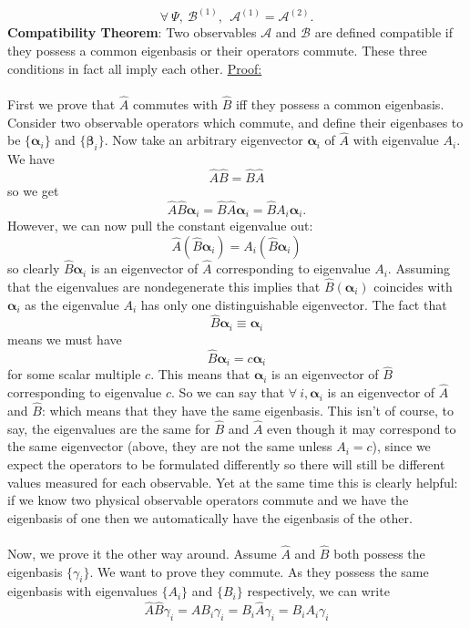 $$
\forall\:\Psi,\:\mathcal{B}^{(1)},\:\:\mathcal{A}^{(1)}=\mathcal{A}^{(2)}.
$$
\Answer
\textbf{Compatibility Theorem}: Two observables $\mathcal{A}$ and $\mathcal{B}$ are defined compatible if they possess a common eigenbasis or their operators commute. These three conditions in fact all imply each other.
\Answerend
\underline{Proof:}
\\\\
First we prove that $\hat{A}$ commutes with $\hat{B}$ iff they possess a common eigenbasis. Consider two observable operators which commute, and define their eigenbases to be $\{\bm{\alpha}_{i}\}$ and $\{\bm{\beta}_{i}\}$. Now take an arbitrary eigenvector $\bm{\alpha}_{i}$ of $\hat{A}$ with eigenvalue $A_{i}$. We have
$$
\hat{A}\hat{B}=\hat{B}\hat{A}
$$
so we get 
$$
\hat{A}\hat{B}\bm{\alpha}_{i}=\hat{B}\hat{A}\bm{\alpha}_{i}=\hat{B}A_{i}\bm{\alpha}_{i}.
$$
However, we can now pull the constant eigenvalue out:
$$
\hat{A}(\hat{B}\bm{\alpha}_{i})=A_{i}(\hat{B}\bm{\alpha}_{i})
$$
so clearly $\hat{B}\bm{\alpha}_{i}$ is an eigenvector of $\hat{A}$ corresponding to eigenvalue $A_{i}$. Assuming that the eigenvalues are nondegenerate this implies that $\hat{B}(\bm{\alpha}_{i})$ coincides with $\bm{\alpha}_{i}$ as the eigenvalue $A_{i}$ has only one distinguishable eigenvector. The fact that 
$$
\hat{B}\bm{\alpha}_{i}\equiv\bm{\alpha}_{i}
$$
means we must have
$$
\hat{B}\bm{\alpha}_{i}=c\bm{\alpha}_{i}
$$
for some scalar multiple $c$. This means that $\bm{\alpha}_{i}$ is an eigenvector of $\hat{B}$ corresponding to eigenvalue $c$. So we can say that $\forall\:i, \bm{\alpha}_{i}$ is an eigenvector of $\hat{A}$ and $\hat{B}$: which means that they have the same eigenbasis. This isn't of course, to say, the eigenvalues are the same for $\hat{B}$ and $\hat{A}$ even though it may correspond to the same eigenvector (above, they are not the same unless $A_{i}=c$), since we expect the operators to be formulated differently so there will still be different values measured for each observable. Yet at the same time this is clearly helpful: if we know two physical observable operators commute and we have the eigenbasis of one then we automatically have the eigenbasis of the other. 
\\\\
Now, we prove it the other way around. Assume $\hat{A}$ and $\hat{B}$ both possess the eigenbasis $\{\gamma_{i}\}$. We want to prove they commute. As they possess the same eigenbasis with eigenvalues $\{A_{i}\}$ and $\{B_{i}\}$ respectively, we can write
$$
\hat{A}\hat{B}\gamma_{i}=\hat{A}B_{i}\gamma_{i}=B_{i}\hat{A}\gamma_{i}=B_{i}A_{i}\gamma_{i}
$$
